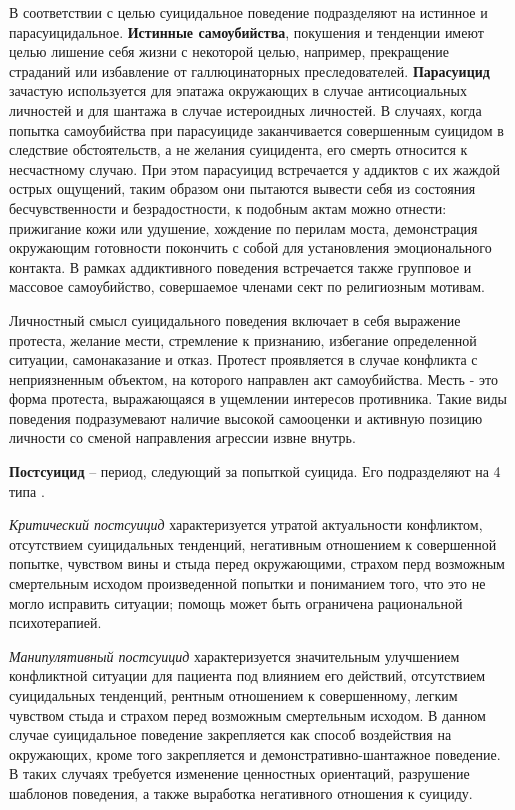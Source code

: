 В соответствии с целью суицидальное поведение подразделяют на истинное и парасуицидальное. \textbf{Истинные самоубийства}, покушения и тенденции имеют целью лишение себя жизни с некоторой целью, например, прекращение страданий или избавление от галлюцинаторных преследователей. \textbf{Парасуицид} зачастую используется для эпатажа окружающих в случае антисоциальных личностей и для шантажа в случае истероидных личностей. В случаях, когда попытка самоубийства при парасуициде заканчивается совершенным суицидом в следствие обстоятельств, а не желания суицидента, его смерть относится к несчастному случаю. При этом парасуицид встречается у аддиктов с их жаждой острых ощущений, таким образом они пытаются вывести себя из состояния бесчувственности и безрадостности, к подобным актам можно отнести: прижигание кожи или удушение, хождение по перилам моста, демонстрация окружающим готовности покончить с собой для установления эмоционального контакта. В рамках аддиктивного поведения встречается также групповое и массовое самоубийство, совершаемое членами сект по религиозным мотивам. \cite{starsen}

Личностный смысл суицидального поведения включает в себя выражение протеста, желание мести, стремление к признанию, избегание определенной ситуации, самонаказание и отказ. Протест проявляется в случае конфликта с неприязненным объектом, на которого направлен акт самоубийства. Месть - это форма протеста, выражающаяся в ущемлении интересов противника. Такие виды поведения подразумевают наличие высокой самооценки и активную позицию личности со сменой направления агрессии извне внутрь. \cite{starsen}

\textbf{Постсуицид} -- период, следующий за попыткой суицида. Его подразделяют на 4 типа \cite{starsen}.

\textit{Критический постсуицид} характеризуется утратой актуальности конфликтом, отсутствием суицидальных тенденций, негативным отношением к совершенной попытке, чувством вины и стыда перед окружающими, страхом перд возможным смертельным исходом произведенной попытки и пониманием того, что это не могло исправить ситуации; помощь может быть ограничена рациональной психотерапией.

\textit{Манипулятивный постсуицид} характеризуется значительным улучшением конфликтной ситуации для пациента под влиянием его действий, отсутствием суицидальных тенденций, рентным отношением к совершенному, легким чувством стыда и страхом перед возможным смертельным исходом. В данном случае суицидальное поведение закрепляется как способ воздействия на окружающих, кроме того закрепляется и демонстративно-шантажное поведение. В таких случаях требуется изменение ценностных ориентаций, разрушение шаблонов поведения, а также выработка негативного отношения к суициду.

